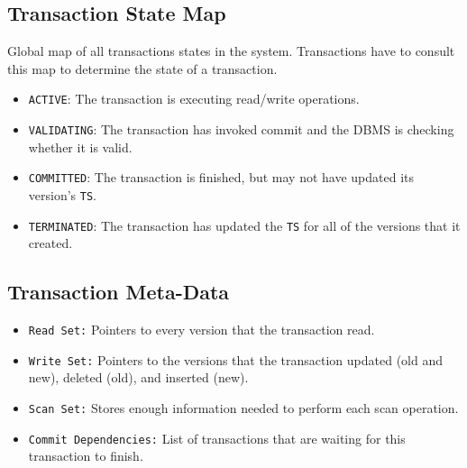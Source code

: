 \documentclass[11pt]{article}
\begin{document}
\subsection*{Transaction State Map}
Global map of all transactions states in the system. Transactions have to consult this map to 
determine the 
state of a transaction.
\begin{itemize}
    \item \texttt{ACTIVE}:
    The transaction is executing read/write operations.
    
    \item \texttt{VALIDATING}:
    The transaction has invoked commit and the DBMS is checking whether it is valid.
    
    \item \texttt{COMMITTED}:
    The transaction is finished, but may not have updated its version's \texttt{TS}.
    
    \item \texttt{TERMINATED}:
    The transaction has updated the \texttt{TS} for all of the versions that it created.
\end{itemize}

\subsection*{Transaction Meta-Data}
\begin{itemize}
    \item \texttt{Read Set:}
    Pointers to every version that the transaction read.
    
    \item \texttt{Write Set:}
    Pointers to the versions that the transaction updated (old and new), deleted (old), 
    and inserted (new).
    
    \item \texttt{Scan Set:}
    Stores enough information needed to perform each scan operation.
    
    \item \texttt{Commit Dependencies:}
    List of transactions that are waiting for this transaction to finish.
\end{itemize}
    
\end{document}
